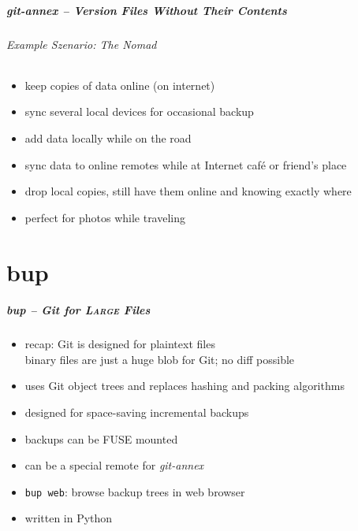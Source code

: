 \documentclass[english,hyperref={pdfpagelabels=false},aspectratio=169]{beamer}
\begin{document}
\begin{frame}
  \frametitle{git-annex -- Version Files Without Their Contents}
  \framesubtitle{Example Szenario: The Nomad}
  \begin{itemize}
    \item keep copies of data online (on internet)
    \item sync several local devices for occasional backup
    \item add data locally while on the road
    \item sync data to online remotes while at Internet café or friend's place
    \item drop local copies, still have them online and knowing exactly where
    \item perfect for photos while traveling
  \end{itemize}
\end{frame}



\part{bup}
\makepart

\begin{frame}[label=bup]
  \frametitle{bup -- Git for \textsc{Large} Files}
  \begin{itemize}
    \item recap: Git is designed for plaintext files\\
      {\scriptsize binary files are just a huge blob for Git; no diff possible}
    \item uses Git object trees and replaces hashing and packing algorithms
    \item designed for space-saving incremental backups
    \item backups can be FUSE mounted
    \item can be a special remote for \textit{git-annex}
    \item \texttt{bup web}: browse backup trees in web browser
    \item written in Python
  \end{itemize}
\end{frame}
\end{document}
